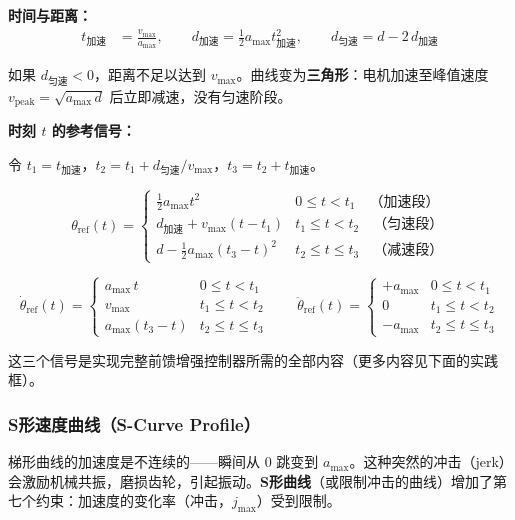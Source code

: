 \textbf{时间与距离：}
\begin{align}
t_{\text{加速}} &= \frac{v_{\max}}{a_{\max}}, \qquad
d_{\text{加速}} = \frac{1}{2}a_{\max}t_{\text{加速}}^2, \qquad
d_{\text{匀速}} = d - 2\,d_{\text{加速}}
\end{align}

如果 $d_{\text{匀速}} < 0$，距离不足以达到 $v_{\max}$。曲线变为\textbf{三角形}：电机加速至峰值速度 $v_{\text{peak}} = \sqrt{a_{\max}\,d}$ 后立即减速，没有匀速阶段。

\textbf{时刻 $t$ 的参考信号：}

令 $t_1 = t_{\text{加速}}$，$t_2 = t_1 + d_{\text{匀速}}/v_{\max}$，$t_3 = t_2 + t_{\text{加速}}$。

\begin{equation}
\theta_{\text{ref}}(t) = \begin{cases}
\tfrac{1}{2}a_{\max}t^2 & 0 \le t < t_1 \quad \text{（加速段）}\\[4pt]
d_{\text{加速}} + v_{\max}(t - t_1) & t_1 \le t < t_2 \quad \text{（匀速段）}\\[4pt]
d - \tfrac{1}{2}a_{\max}(t_3-t)^2 & t_2 \le t \le t_3 \quad \text{（减速段）}
\end{cases}
\end{equation}

\begin{equation}
\dot{\theta}_{\text{ref}}(t) = \begin{cases}
a_{\max}\,t & 0 \le t < t_1 \\
v_{\max} & t_1 \le t < t_2 \\
a_{\max}(t_3 - t) & t_2 \le t \le t_3
\end{cases}
\qquad
\ddot{\theta}_{\text{ref}}(t) = \begin{cases}
+a_{\max} & 0 \le t < t_1 \\
0 & t_1 \le t < t_2 \\
-a_{\max} & t_2 \le t \le t_3
\end{cases}
\end{equation}

这三个信号是实现完整前馈增强控制器所需的全部内容（更多内容见下面的实践框）。

\subsubsection{S形速度曲线（S-Curve Profile）}

梯形曲线的加速度是不连续的——瞬间从 $0$ 跳变到 $a_{\max}$。这种突然的冲击（jerk）会激励机械共振，磨损齿轮，引起振动。\textbf{S形曲线}（或限制冲击的曲线）增加了第七个约束：加速度的变化率（冲击，$j_{\max}$）受到限制。

